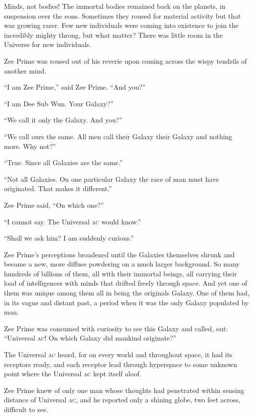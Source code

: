Minds, not bodies! The immortal bodies remained back on the planets, in suspension over the eons. Sometimes they roused for material activity but that was growing rarer. Few new individuals were coming into existence to join the incredibly mighty throng, but what matter? There was little room in the Universe for new individuals.

Zee Prime was roused out of his reverie upon coming across the wispy tendrils of another mind.

\enquote{I am Zee Prime,} said Zee Prime. \enquote{And you?}

\enquote{I am Dee Sub Wun. Your Galaxy?}

\enquote{We call it only the Galaxy. And you?}

\enquote{We call ours the same. All men call their Galaxy their Galaxy and nothing more. Why not?}

\enquote{True. Since all Galaxies are the same.}

\enquote{Not all Galaxies. On one particular Galaxy the race of man must have originated. That makes it different.}

Zee Prime said, \enquote{On which one?}

\enquote{I cannot say. The Universal \textsc{ac} would know.}

\enquote{Shall we ask him? I am suddenly curious.}

Zee Prime's perceptions broadened until the Galaxies themselves shrunk and became a new, more diffuse powdering on a much larger background. So many hundreds of billions of them, all with their immortal beings, all carrying their load of intelligences with minds that drifted freely through space. And yet one of them was unique among them all in being the originals Galaxy. One of them had, in its vague and distant past, a period when it was the only Galaxy populated by man.

Zee Prime was consumed with curiosity to see this Galaxy and called, out: \enquote{Universal \textsc{ac}! On which Galaxy did mankind originate?}

The Universal \textsc{ac} heard, for on every world and throughout space, it had its receptors ready, and each receptor lead through hyperspace to some unknown point where the Universal \textsc{ac} kept itself aloof.

Zee Prime knew of only one man whose thoughts had penetrated within sensing distance of Universal \textsc{ac}, and he reported only a shining globe, two feet across, difficult to see.

